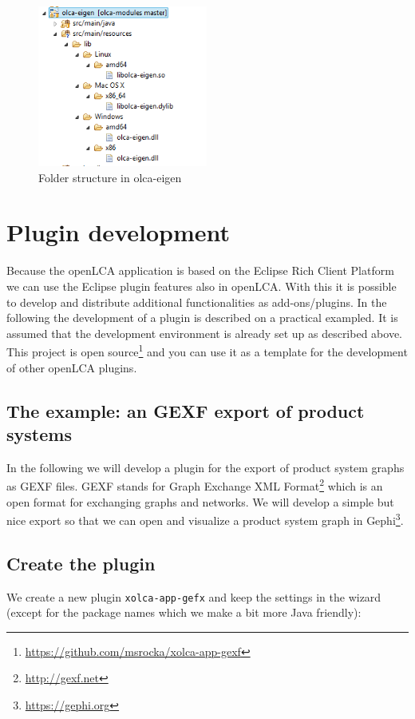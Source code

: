 \documentclass{scrreprt}
\begin{document}
\begin{figure}[H]
\centering
\includegraphics[height=200px]{images/structure_native_libs.png}
\caption{Folder structure in olca-eigen}
\end{figure}  


\chapter{Plugin development}
Because the openLCA application is based on the Eclipse Rich Client Platform we can use the Eclipse plugin features also in openLCA. With this it is possible to develop and distribute additional functionalities as add-ons/plugins. In the following the development of a plugin is described on a practical exampled. It is assumed that the development environment is already set up as described above. This project is open source\footnote{\url{https://github.com/msrocka/xolca-app-gexf}} and you can use it as a template for the development of other openLCA plugins.

\section{The example: an GEXF export of product systems}
In the following we will develop a plugin for the export of product system graphs as GEXF files. GEXF stands for Graph Exchange XML Format\footnote{\url{http://gexf.net}} which is an open format for exchanging graphs and networks. We will develop a simple but nice export so that we can open and visualize a product system graph in Gephi\footnote{\url{https://gephi.org}}.  

\section{Create the plugin}
We create a new plugin \texttt{xolca-app-gefx} and keep the settings in the wizard (except for the package names which we make a bit more Java friendly):
\end{document}
